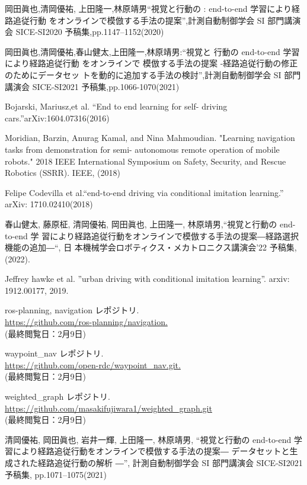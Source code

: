 \documentclass{jarticle}
\begin{document}
\footnotesize
\begin{thebibliography}{99}



岡田眞也,清岡優祐, 上田隆一,林原靖男“視覚と行動の : end-to-end 学習により経路追従行動 をオンラインで模倣する手法の提案”,計測自動制御学会 SI 部門講演会 SICE-SI2020 予稿集,pp.1147–1152(2020)

岡田眞也,清岡優祐,春山健太,上田隆一,林原靖男:“視覚と 行動の end-to-end 学習により経路追従行動 をオンラインで 模倣する手法の提案 -経路追従行動の修正のためにデータセッ トを動的に追加する手法の検討”,計測自動制御学会 SI 部門 講演会 SICE-SI2021 予稿集,pp.1066-1070(2021)

Bojarski, Mariusz,et al. “End to end learning for self- driving cars.”arXiv:1604.07316(2016)

Moridian, Barzin, Anurag Kamal, and Nina Mahmoudian. "Learning navigation tasks from demonstration for semi- autonomous remote operation of mobile robots." 2018 IEEE International Symposium on Safety, Security, and Rescue Robotics (SSRR). IEEE, (2018)

Felipe Codevilla et al.“end-to-end driving via conditional imitation learning.” arXiv: 1710.02410(2018)

春山健太, 藤原柾, 清岡優祐, 岡田眞也, 上田隆一, 林原靖男,“視覚と行動の end-to-end 学 習により経路追従行動をオンラインで模倣する手法の提案―経路選択機能の追加―“, 日 本機械学会ロボティクス・メカトロニクス講演会’22 予稿集,(2022).

Jeffrey hawke et al. ”urban driving with conditional imitation learning”. arxiv: 1912.00177, 2019.

ros-planning, navigation レポジトリ. \\\url{https://github.com/ros-planning/navigation.}\\
(最終閲覧日：2月9日)

waypoint\_nav レポジトリ. \\\url{https://github.com/open-rdc/waypoint_nav.git.}\\
(最終閲覧日：2月9日)

weighted\_graph レポジトリ. \\\url{https://github.com/masakifujiwara1/weighted_graph.git}\\
(最終閲覧日：2月9日)

清岡優祐, 岡田眞也, 岩井一輝, 上田隆一, 林原靖男, “視覚と行動の end-to-end 学習により経路追従行動をオンラインで模倣する手法の提案―
データセットと生成された経路追従行動の解析 ―”, 計測自動制御学会 SI 部門講演会 SICE-SI2021 予稿集, pp.1071–1075(2021)

\end{thebibliography}

\normalsize
\end{document}

